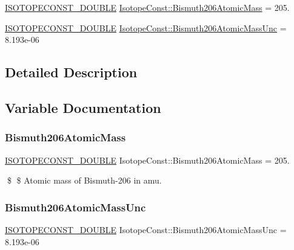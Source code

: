 \begin{DoxyCompactItemize}
\item 
\mbox{\hyperlink{group___isotope_const-_macros_ga8f45a7272ce02c0b4c65c44636ed719a}{I\+S\+O\+T\+O\+P\+E\+C\+O\+N\+S\+T\+\_\+\+D\+O\+U\+B\+LE}} \mbox{\hyperlink{group___isotope_const-_bismuth-_bi206_ga26c9e0fe13426b6554387a26d30d3f29}{Isotope\+Const\+::\+Bismuth206\+Atomic\+Mass}} = 205.
\item 
\mbox{\hyperlink{group___isotope_const-_macros_ga8f45a7272ce02c0b4c65c44636ed719a}{I\+S\+O\+T\+O\+P\+E\+C\+O\+N\+S\+T\+\_\+\+D\+O\+U\+B\+LE}} \mbox{\hyperlink{group___isotope_const-_bismuth-_bi206_gac5d96c6fa85dc07f0dc3e03805f4fc2c}{Isotope\+Const\+::\+Bismuth206\+Atomic\+Mass\+Unc}} = 8.\+193e-\/06
\end{DoxyCompactItemize}


\subsection{Detailed Description}


\subsection{Variable Documentation}
\mbox{\label{group___isotope_const-_bismuth-_bi206_ga26c9e0fe13426b6554387a26d30d3f29}} 
\subsubsection{\texorpdfstring{Bismuth206\+Atomic\+Mass}{Bismuth206AtomicMass}}
{\footnotesize\ttfamily \mbox{\hyperlink{group___isotope_const-_macros_ga8f45a7272ce02c0b4c65c44636ed719a}{I\+S\+O\+T\+O\+P\+E\+C\+O\+N\+S\+T\+\_\+\+D\+O\+U\+B\+LE}} Isotope\+Const\+::\+Bismuth206\+Atomic\+Mass = 205.}

\$ \$ Atomic mass of Bismuth-\/206 in amu. \mbox{\label{group___isotope_const-_bismuth-_bi206_gac5d96c6fa85dc07f0dc3e03805f4fc2c}} 
\subsubsection{\texorpdfstring{Bismuth206\+Atomic\+Mass\+Unc}{Bismuth206AtomicMassUnc}}
{\footnotesize\ttfamily \mbox{\hyperlink{group___isotope_const-_macros_ga8f45a7272ce02c0b4c65c44636ed719a}{I\+S\+O\+T\+O\+P\+E\+C\+O\+N\+S\+T\+\_\+\+D\+O\+U\+B\+LE}} Isotope\+Const\+::\+Bismuth206\+Atomic\+Mass\+Unc = 8.\+193e-\/06}

